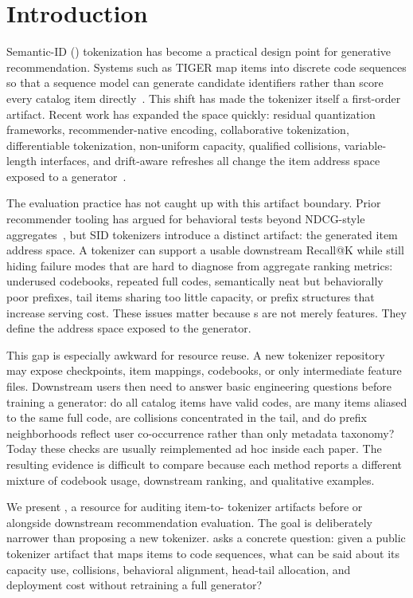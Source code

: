 \section{Introduction}

Semantic-ID (\sid) tokenization has become a practical design point for
generative recommendation. Systems such as TIGER map items into discrete code
sequences so that a sequence model can generate candidate identifiers rather
than score every catalog item directly~\cite{rajput2023tiger}. This shift has
made the tokenizer itself a first-order artifact. Recent work has expanded the
space quickly: residual quantization frameworks, recommender-native encoding,
collaborative tokenization, differentiable tokenization, non-uniform capacity,
qualified collisions, variable-length interfaces, and drift-aware refreshes all
change the item address space exposed to a generator~\cite{ju2025grid,liang2026resid,zhu2024cost,fu2026diger,wei2026card,hu2026quasid,cheng2026capsid,feng2026dact}.

The evaluation practice has not caught up with this artifact boundary. Prior
recommender tooling has argued for behavioral tests beyond NDCG-style
aggregates~\cite{chia2022reclist}, but SID tokenizers introduce a distinct
artifact: the generated item address space. A
tokenizer can support a usable downstream Recall@K while still hiding failure
modes that are hard to diagnose from aggregate ranking metrics: underused
codebooks, repeated full codes, semantically neat but behaviorally poor
prefixes, tail items sharing too little capacity, or prefix structures that
increase serving cost. These issues matter because \sid{}s are not merely
features. They define the address space exposed to the generator.

This gap is especially awkward for resource reuse. A new tokenizer repository
may expose checkpoints, item mappings, codebooks, or only intermediate feature
files. Downstream users then need to answer basic engineering questions before
training a generator: do all catalog items have valid codes, are many items
aliased to the same full code, are collisions concentrated in the tail, and do
prefix neighborhoods reflect user co-occurrence rather than only metadata
taxonomy? Today these checks are usually reimplemented ad hoc inside each
paper. The resulting evidence is difficult to compare because each method
reports a different mixture of codebook usage, downstream ranking, and
qualitative examples.

We present \tool, a resource for auditing item-to-\sid{} tokenizer artifacts
before or alongside downstream recommendation evaluation. The goal is
deliberately narrower than proposing a new tokenizer. \tool asks a concrete
question: given a public tokenizer artifact that maps items to code sequences,
what can be said about its capacity use, collisions, behavioral alignment,
head-tail allocation, and deployment cost without retraining a full generator?

